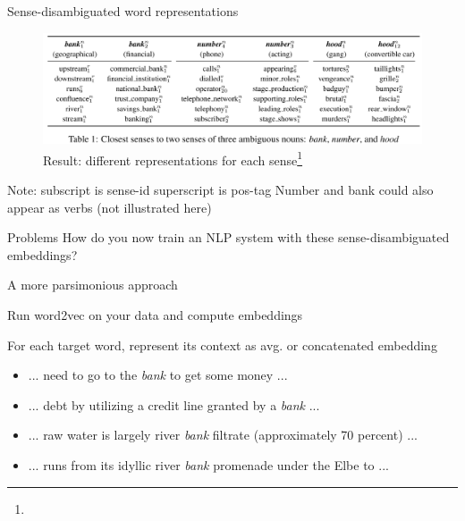\documentclass[12pt]{beamer}
\begin{document}
\begin{frame}{Sense-disambiguated word representations}
	
\begin{figure}
\includegraphics[width=0.95\linewidth]{img/sensembed1.png}
\caption{Result: different representations for each sense\footnote{}}
\end{figure}

Note: subscript is sense-id superscript is pos-tag
Number and bank could also appear as verbs (not illustrated here)

	
\end{frame}


\begin{frame}{Problems}
How do you now train an NLP system with these sense-disambiguated embeddings?

\end{frame}


\begin{frame}{A more parsimonious approach}

	Run word2vec on your data and compute embeddings
	
	For each target word, represent its context as avg. or concatenated embedding
	
\begin{itemize}
	\item ... need to go to the \emph{bank} to get some money ...
	\item ... debt by utilizing a credit line granted by a \emph{bank} ...
	\item ... raw water is largely river \emph{bank} filtrate (approximately 70 percent) ...
	\item ... runs from its idyllic river \emph{bank} promenade under the Elbe to ...
\end{itemize}

	
\end{frame}
\end{document}
